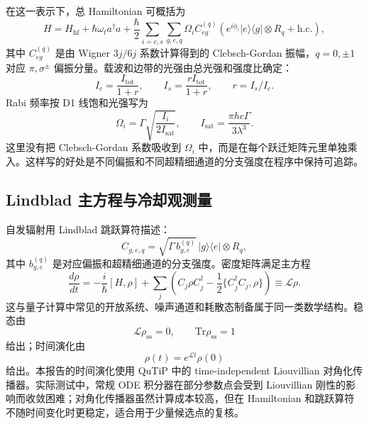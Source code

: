 \documentclass[UTF8,a4paper,12pt]{ctexart}
\newcommand{\ket}[1]{\ensuremath{|#1\rangle}}
\newcommand{\bra}[1]{\ensuremath{\langle #1|}}
\begin{document}
在这一表示下，总 Hamiltonian 可概括为
\begin{equation}
H=H_{\mathrm{hf}}+\hbar\omega_t a^\dagger a
+\frac{\hbar}{2}\sum_{i=c,s}\sum_{g,e,q}
\Omega_i C_{eg}^{(q)}
\left(
e^{i\phi_i}\ket{e}\bra{g}\otimes R_q+\mathrm{h.c.}
\right),
\label{eq:full_hamiltonian}
\end{equation}
其中 $C_{eg}^{(q)}$ 是由 Wigner $3j/6j$ 系数计算得到的 Clebsch-Gordan 振幅，$q=0,\pm1$ 对应 $\pi,\sigma^\pm$ 偏振分量。载波和边带的光强由总光强和强度比确定：
\begin{equation}
I_c=\frac{I_{\mathrm{tot}}}{1+r},\qquad
I_s=\frac{r I_{\mathrm{tot}}}{1+r},\qquad r=I_s/I_c .
\end{equation}
Rabi 频率按 D1 线饱和光强写为
\begin{equation}
\Omega_i=\Gamma\sqrt{\frac{I_i}{2I_{\mathrm{sat}}}},
\qquad
I_{\mathrm{sat}}=\frac{\pi h c\Gamma}{3\lambda^3}.
\label{eq:rabi}
\end{equation}
这里没有把 Clebsch-Gordan 系数吸收到 $\Omega_i$ 中，而是在每个跃迁矩阵元里单独乘入。这样写的好处是不同偏振和不同超精细通道的分支强度在程序中保持可追踪。

\subsection{Lindblad 主方程与冷却观测量}

自发辐射用 Lindblad 跳跃算符描述：
\begin{equation}
C_{g,e,q}=\sqrt{\Gamma\,b_{g,e}^{(q)}}\,
\ket{g}\bra{e}\otimes R_q ,
\end{equation}
其中 $b_{g,e}^{(q)}$ 是对应偏振和超精细通道的分支强度。密度矩阵满足主方程
\begin{equation}
\frac{d\rho}{dt}
=-\frac{i}{\hbar}[H,\rho]
+\sum_j\left(
C_j\rho C_j^\dagger
-\frac{1}{2}\{C_j^\dagger C_j,\rho\}
\right)
\equiv \mathcal{L}\rho .
\label{eq:lindblad}
\end{equation}
这与量子计算中常见的开放系统、噪声通道和耗散态制备属于同一类数学结构。稳态由
\begin{equation}
\mathcal{L}\rho_{\mathrm{ss}}=0,\qquad \mathrm{Tr}\rho_{\mathrm{ss}}=1
\end{equation}
给出；时间演化由
\begin{equation}
\rho(t)=e^{\mathcal{L}t}\rho(0)
\end{equation}
给出。本报告的时间演化使用 QuTiP 中的 time-independent Liouvillian 对角化传播器。实际测试中，常规 ODE 积分器在部分参数点会受到 Liouvillian 刚性的影响而收敛困难；对角化传播器虽然计算成本较高，但在 Hamiltonian 和跳跃算符不随时间变化时更稳定，适合用于少量候选点的复核。
\end{document}
